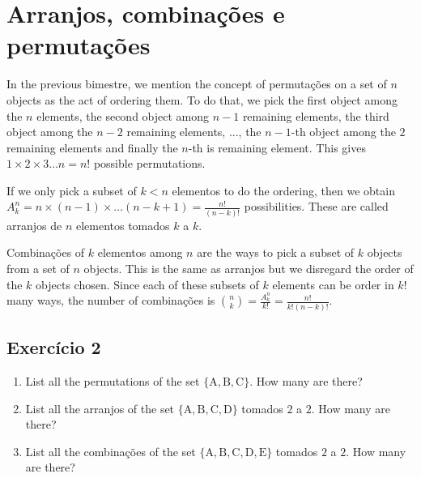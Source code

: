 \section{Arranjos, combinações e permutações}

In the previous bimestre, we mention the concept of permutações on a set of
$n$ objects as the act of ordering them.
To do that, we pick the first object among the $n$ elements, the
second object among $n-1$ remaining elements, the third object among the $n-2$
remaining elements, ..., the $n-1$-th object among the $2$ remaining elements
and finally the $n$-th is remaining element. This gives
$1 \times 2 \times 3 \dots n = n!$ possible permutations.

If we only pick a subset of $k < n$ elementos to do the ordering, then
we obtain
$A_k^n = n \times {(n-1)} \times \dots {(n - k + 1)} = \frac{n!}{{(n-k)}!}$
possibilities. These are called arranjos de $n$ elementos tomados $k$ a $k$.

Combinações of $k$ elementos among $n$ are the ways to pick a subset of $k$
objects from a set of $n$ objects. This is the same as arranjos but we disregard
the order of the $k$ objects chosen. Since each of these subsets of $k$ elements
can be order in $k!$ many ways, the number of combinações is
$\binom{n}{k} = \frac{A_k^n}{k!} = \frac{n!}{k! {(n-k)}!}$.

\subsection*{Exercício 2}

\begin{enumerate}
\item List all the permutations of the set
  $\{\text{A}, \text{B}, \text{C}\}$. How many are there?
\item List all the arranjos of the set
  $\{\text{A}, \text{B}, \text{C}, \text{D}\}$ tomados $2$ a $2$.
  How many are there?
\item List all the combinações of the set
  $\{\text{A}, \text{B}, \text{C}, \text{D}, \text{E}\}$ tomados $2$ a $2$.
  How many are there?
\end{enumerate}

